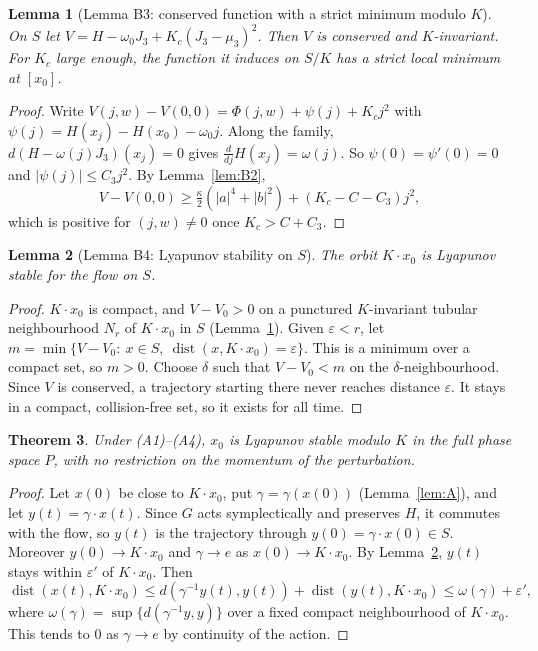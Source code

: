 \documentclass[11pt]{article}
\newtheorem{theorem}{Theorem}
\newtheorem{lemma}[theorem]{Lemma}
\theoremstyle{definition}
\theoremstyle{remark}
\begin{document}
\begin{lemma}[Lemma B3: conserved function with a strict minimum modulo $K$]\label{lem:B3}
On $S$ let $V=H-\omega_0J_3+K_c(J_3-\mu_3)^2$. Then $V$ is conserved and $K$-invariant. For $K_c$
large enough, the function it induces on $S/K$ has a strict local minimum at $[x_0]$.
\end{lemma}

\begin{proof}
Write $V(j,w)-V(0,0)=\Phi(j,w)+\psi(j)+K_cj^2$ with $\psi(j)=H(x_j)-H(x_0)-\omega_0j$. Along the family,
$d(H-\omega(j)J_3)(x_j)=0$ gives $\tfrac{d}{dj}H(x_j)=\omega(j)$. So $\psi(0)=\psi'(0)=0$ and
$|\psi(j)|\le C_3j^2$. By Lemma~\ref{lem:B2},
\[
V-V(0,0)\ge\tfrac\kappa2(|a|^4+|b|^2)+(K_c-C-C_3)j^2,
\]
which is positive for $(j,w)\ne0$ once $K_c>C+C_3$.
\end{proof}

\begin{lemma}[Lemma B4: Lyapunov stability on $S$]\label{lem:B4}
The orbit $K\cdot x_0$ is Lyapunov stable for the flow on $S$.
\end{lemma}

\begin{proof}
$K\cdot x_0$ is compact, and $V-V_0>0$ on a punctured $K$-invariant tubular neighbourhood $N_r$ of
$K\cdot x_0$ in $S$ (Lemma~\ref{lem:B3}). Given $\varepsilon<r$, let
$m=\min\{V-V_0:\ x\in S,\ \operatorname{dist}(x,K\cdot x_0)=\varepsilon\}$. This is a minimum over a
compact set, so $m>0$. Choose $\delta$ such that $V-V_0<m$ on the $\delta$-neighbourhood. Since $V$ is
conserved, a trajectory starting there never reaches distance $\varepsilon$. It stays in a compact,
collision-free set, so it exists for all time.
\end{proof}

\begin{theorem}\label{thm:abstract}
Under (A1)--(A4), $x_0$ is Lyapunov stable modulo $K$ in the full phase space $P$, with no restriction on
the momentum of the perturbation.
\end{theorem}

\begin{proof}
Let $x(0)$ be close to $K\cdot x_0$, put $\gamma=\gamma(x(0))$ (Lemma~\ref{lem:A}), and let
$y(t)=\gamma\cdot x(t)$. Since $G$ acts symplectically and preserves $H$, it commutes with the flow, so
$y(t)$ is the trajectory through $y(0)=\gamma\cdot x(0)\in S$. Moreover $y(0)\to K\cdot x_0$ and
$\gamma\to e$ as $x(0)\to K\cdot x_0$. By Lemma~\ref{lem:B4}, $y(t)$ stays within $\varepsilon'$ of
$K\cdot x_0$. Then
\[
\operatorname{dist}(x(t),K\cdot x_0)\le d(\gamma^{-1}y(t),y(t))+\operatorname{dist}(y(t),K\cdot x_0)
\le\omega(\gamma)+\varepsilon',
\]
where $\omega(\gamma)=\sup\{d(\gamma^{-1}y,y)\}$ over a fixed compact neighbourhood of $K\cdot x_0$. This
tends to $0$ as $\gamma\to e$ by continuity of the action.
\end{proof}
\end{document}
